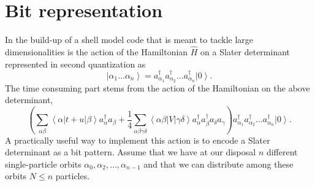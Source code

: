 \documentclass[prc]{revtex4}
\newcommand{\bra}[1]{\left\langle #1 \right|}
\newcommand{\ket}[1]{\left| #1 \right\rangle}
\newcommand{\element}[3]
    {\bra{#1}#2\ket{#3}}
\begin{document}
\section*{Bit representation}
In the build-up of a shell model code that is meant to tackle large dimensionalities
is the action of the Hamiltonian $\hat{H}$ on a 
Slater determinant represented in second quantization as
\[
\ket{\alpha_1\dots \alpha_n} = a_{\alpha_1}^\dagger a_{\alpha_2}^\dagger \dots a_{\alpha_n}^\dagger \ket{0}.
\]
The time consuming part stems from the action of the Hamiltonian
on the above determinant,
\[
\left(\sum_{\alpha\beta} \element{\alpha}{t+u}{\beta} a_\alpha^\dagger a_\beta + \frac{1}{4} \sum_{\alpha\beta\gamma\delta}
		\element{\alpha \beta}{V}{\gamma \delta} a_\alpha^\dagger a_\beta^\dagger a_\delta a_\gamma\right)a_{\alpha_1}^\dagger a_{\alpha_2}^\dagger \dots a_{\alpha_n}^\dagger \ket{0}.
\]
A practically useful way to implement this action is to encode a Slater determinant as a bit pattern. 
Assume that we have at our disposal $n$ different single-particle orbits
$\alpha_0,\alpha_2,\dots,\alpha_{n-1}$ and that we can distribute  among these orbits $N\le n$ particles.
\end{document}
